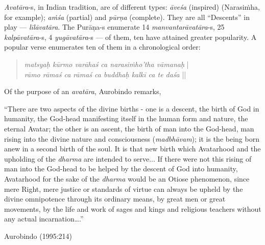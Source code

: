 {\sl Avatāra}-s, in Indian tradition, are of different types: {\sl āveśa} (inspired) (Narasiṁha, for example); {\sl aṁśa} (partial) and {\sl pūrṇa} (complete). They are all “Descents” in play --- {\sl līlāvatāra}. The Purāṇa-s enumerate 14 {\sl manvantarāvatāra}-s, 25 {\sl kalpāvatāra}-s, 4 {\sl yugāvatāra}-s --- of them, ten have attained greater popularity. A popular verse enumerates ten of them in a chronological order:
\begin{quote}
{{\sl matsyaḥ kūrmo varāhaś ca narasiṁho’tha vāmanaḥ}} |\\
{\sl rāmo rāmaś ca rāmaś ca buddhaḥ kalkī ca te daśa} ||
\end{quote}

Of the purpose of an {\sl avatāra}, Aurobindo remarks, 

\begin{myquote}
“There are two aspects of the divine births - one is a descent, the birth of God in humanity, the God-head manifesting itself in the human form and nature, the eternal Avatar; the other is an ascent, the birth of man into the God-head, man rising into the divine nature and consciousness ({\sl madbhāvam}); it is the being born anew in a second birth of the soul. It is that new birth which Avatarhood and the upholding of the {\sl dharma} are intended to serve... If there were not this rising of man into the God-head to be helped by the descent of God into humanity, Avatarhood for the sake of the {\sl dharma} would be an Otiose phenomenon, since mere Right, mere justice or standards of virtue can always be upheld by the divine omnipotence through its ordinary means, by great men or great movements, by the life and work of sages and kings and religious teachers without any actual incarnation….”

\hfill Aurobindo (1995:214)
\end{myquote}

